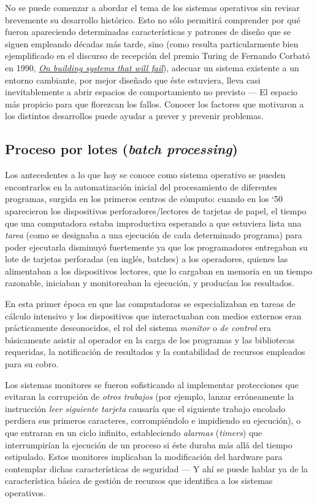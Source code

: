 \documentclass[11pt,fleqn]{book} %
\begin{document}
No se puede comenzar a abordar el tema de los sistemas operativos sin
revisar brevemente su desarrollo histórico. Esto no sólo permitirá
comprender por qué fueron apareciendo determinadas características y
patrones de diseño que se siguen empleando décadas más tarde, sino
(como resulta particularmente bien ejemplificado en el discurso de
recepción del premio Turing de Fernando Corbató en 1990, \emph{\href{http://dl.acm.org/citation.cfm?id=1283947}{On building systems that will fail}}), adecuar un sistema existente a un entorno
cambiante, por mejor diseñado que éste estuviera, lleva casi
inevitablemente a abrir espacios de comportamiento no previsto — El
espacio más propicio para que florezcan los fallos. Conocer los
factores que motivaron a los distintos desarrollos puede ayudar a
prever y prevenir problemas.
\subsection{Proceso por lotes (\emph{batch processing})}
\label{sec-1-3-1}


Los antecedentes a lo que hoy se conoce como sistema operativo
se pueden encontrarlos en la automatización inicial del procesamiento de
diferentes programas, surgida en los primeros centros de
cómputo: cuando en los `50 aparecieron los dispositivos
perforadores/lectores de tarjetas de papel, el tiempo que una
computadora estaba improductiva esperando a que estuviera lista una
\emph{tarea} (como se designaba a una ejecución de cada determinado
programa) para poder ejecutarla disminuyó fuertemente ya que los programadores
entregaban su lote de tarjetas perforadas (en inglés,
batches) a los operadores, quienes las alimentaban a los dispositivos
lectores, que lo cargaban en memoria en un tiempo razonable, iniciaban
y monitoreaban la ejecución, y producían los resultados.

En esta primer época en que las computadoras se especializaban en
tareas de cálculo intensivo y los dispositivos que interactuaban con
medios externos eran prácticamente desconocidos, el rol del sistema
\emph{monitor} o \emph{de control} era básicamente asistir al operador en la
carga de los programas y las bibliotecas requeridas, la notificación
de resultados y la contabilidad de recursos empleados para su cobro.

Los sistemas monitores se fueron sofisticando al implementar
protecciones que evitaran la corrupción de \emph{otros trabajos} (por
ejemplo, lanzar erróneamente la instrucción \emph{leer siguiente tarjeta}
causaría que el siguiente trabajo encolado perdiera sus primeros
caracteres, corrompiéndolo e impidiendo su ejecución), o que entraran
en un ciclo infinito, estableciendo \emph{alarmas} (\emph{timers}) que
interrumpirían la ejecución de un proceso si éste duraba más allá del
tiempo estipulado. Estos monitores implicaban la modificación del
hardware para contemplar dichas características de seguridad — Y ahí
se puede hablar ya de la característica básica de gestión de recursos
que identifica a los sistemas operativos.
\end{document}
